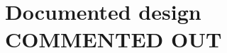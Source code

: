 \documentclass[11pt, a4paper]{article}
\begin{document}
\newpage



\newpage
\section{Documented design COMMENTED OUT}

\end{document}
